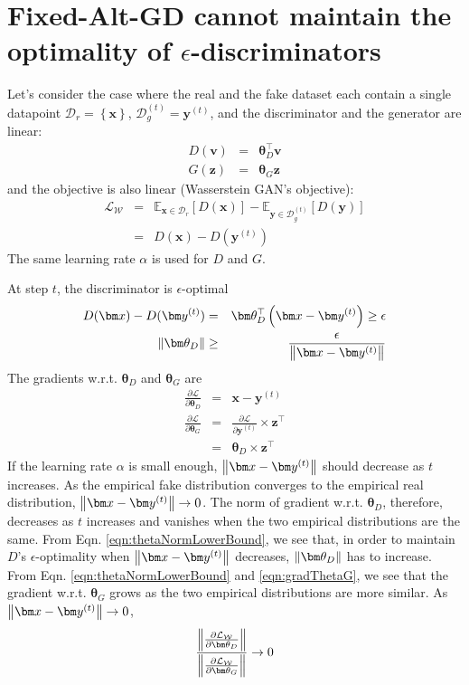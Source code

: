 \documentclass{article} %
\begin{document}
\section{Fixed-Alt-GD cannot maintain the optimality of $\epsilon$-discriminators}
\label{appx:maintainOptimal}
Let's consider the case where the real and the fake dataset each contain a single datapoint $\mathcal{D}_r = \left\lbrace \bm x \right\rbrace$, $\mathcal{D}_g^{(t)} = \bm y^{(t)}$, and the discriminator and the generator are linear:
\begin{eqnarray*}
D(\bm v) & = & \bm \theta_D^\top \bm v \\
G(\bm z) & = & \bm \theta_G \bm z
\end{eqnarray*}
and the objective is also linear (Wasserstein GAN's objective):
\begin{eqnarray}
 \mathcal{L_{\mathcal{W}}} & = & \mathbb{E}_{\bm x \in \mathcal{D}_r}[D(\bm x)] - \mathbb{E}_{\bm y \in \mathcal{D}_g^{(t)}}[D(\bm y)] \nonumber \\
 & = & D(\bm x) - D(\bm y^{(t)}) \nonumber 
\end{eqnarray}
The same learning rate $\alpha$ is used for $D$ and $G$.

At step $t$, the discriminator is $\epsilon$-optimal
\begin{eqnarray}
D(\bm x) - D(\bm y^{(t)}) & = & \bm \theta_D^\top \left( \bm x - \bm y^{(t)} \right) \ge \epsilon  \label{eqn:linearEpsOptimal} \\
\norm{\bm \theta_D} & \ge & \frac{\epsilon}{\norm{\bm x - \bm y^{(t)}}} \label{eqn:thetaNormLowerBound}
\end{eqnarray}
The gradients w.r.t. $\bm \theta_D$ and $\bm \theta_G$ are
\begin{eqnarray}
\frac{\partial \mathcal{L}}{\partial \bm \theta_D} & = & \bm x - \bm y^{(t)} \\
\frac{\partial \mathcal{L}}{\partial \bm \theta_G} & = & \frac{\partial \mathcal{L}}{\partial \bm y^{(t)}} \times \bm z^\top \nonumber \\
& = & \bm \theta_D \times \bm z^\top \label{eqn:gradThetaG}
\end{eqnarray}
If the learning rate $\alpha$ is small enough, $\norm{\bm x - \bm y^{(t)}}$ should decrease as $t$ increases. As the empirical fake distribution converges to the empirical real distribution, $\norm{\bm x - \bm y^{(t)}} \rightarrow 0$. The norm of gradient w.r.t. $\bm \theta_D$, therefore, decreases as $t$ increases and vanishes when the two empirical distributions are the same. 
From Eqn. \ref{eqn:thetaNormLowerBound}, we see that, in order to maintain $D$'s $\epsilon$-optimality when $\norm{\bm x - \bm y^{(t)}}$ decreases, $\norm{\bm \theta_D}$ has to increase. 
From Eqn. \ref{eqn:thetaNormLowerBound} and \ref{eqn:gradThetaG}, we see that the gradient w.r.t. $\bm \theta_G$ grows as the two empirical distributions are more similar. As $\norm{\bm x - \bm y^{(t)}} \rightarrow 0$,
\begin{eqnarray}
\frac{\norm{\frac{\partial \mathcal{L}_{\mathcal{W}}}{\partial \bm \theta_D}}}{\norm{\frac{\partial \mathcal{L}_{\mathcal{W}}}{\partial \bm \theta_G}}} \rightarrow 0
\end{eqnarray}
\end{document}
